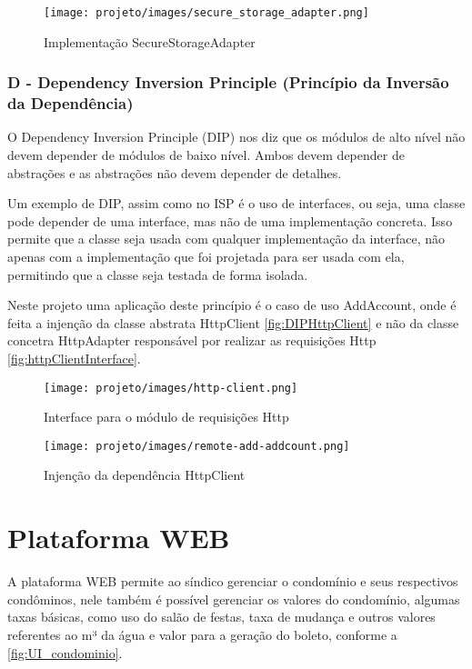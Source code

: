 \documentclass[12pt]{article}
\begin{document}
\begin{figure}[!ht]
  \centering
  \texttt{[image: projeto/images/secure\_storage\_adapter.png]}
  \caption{Implementação SecureStorageAdapter}
  \label{fig:SecureStorageAdapter}
\end{figure}

\subsubsection{D - Dependency Inversion Principle (Princípio da Inversão da Dependência)}
\label{DIP}
O Dependency Inversion Principle (DIP) nos diz que os módulos de alto nível não devem depender de módulos de baixo nível. Ambos devem depender de abstrações e as abstrações não devem depender de detalhes.

Um exemplo de DIP, assim como no ISP é o uso de interfaces, ou seja, uma classe pode depender de uma interface, mas não de uma implementação concreta. Isso permite que a classe seja usada com qualquer implementação da interface, não apenas com a implementação que foi projetada para ser usada com ela, permitindo que a classe seja testada de forma isolada.

Neste projeto uma aplicação deste princípio é o caso de uso AddAccount, onde é feita a injenção da classe abstrata HttpClient \autoref{fig:DIPHttpClient} e não da classe concetra HttpAdapter responsável por realizar as requisições Http \autoref{fig:httpClientInterface}.

\begin{figure}[!ht]
  \centering
  \texttt{[image: projeto/images/http-client.png]}
  \caption{Interface para o módulo de requisições Http}
  \label{fig:httpClientInterface}
\end{figure}

\begin{figure}[!ht]
  \centering
  \texttt{[image: projeto/images/remote-add-addcount.png]}
  \caption{Injenção da dependência HttpClient}
  \label{fig:DIPHttpClient}
\end{figure}

\section{Plataforma WEB}
A plataforma WEB permite ao síndico gerenciar o condomínio e seus respectivos condôminos, nele também é possível gerenciar os valores do condomínio, algumas taxas básicas, como uso do salão de festas, taxa de mudança e outros valores referentes ao m³ da água e valor para a geração do boleto, conforme a  \autoref{fig:UI_condominio}.
\end{document}
